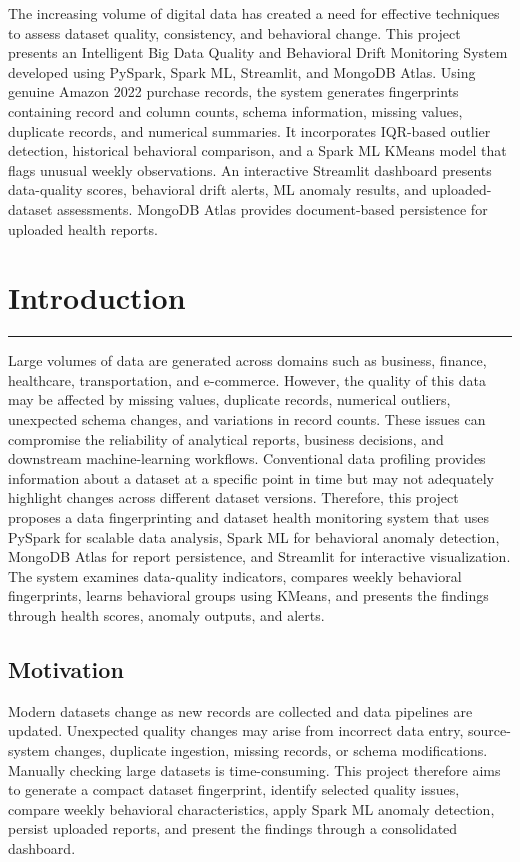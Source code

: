 \documentclass[12pt,a4paper]{report}
\begin{document}
The increasing volume of digital data has created a need for effective techniques to assess dataset quality, consistency, and behavioral change. This project presents an Intelligent Big Data Quality and Behavioral Drift Monitoring System developed using PySpark, Spark ML, Streamlit, and MongoDB Atlas. Using genuine Amazon 2022 purchase records, the system generates fingerprints containing record and column counts, schema information, missing values, duplicate records, and numerical summaries. It incorporates IQR-based outlier detection, historical behavioral comparison, and a Spark ML KMeans model that flags unusual weekly observations. An interactive Streamlit dashboard presents data-quality scores, behavioral drift alerts, ML anomaly results, and uploaded-dataset assessments. MongoDB Atlas provides document-based persistence for uploaded health reports.



\clearpage
\listoffigures
\clearpage
\tableofcontents
\clearpage
{}

\chapter{Introduction}
\rule{\textwidth}{2pt}

Large volumes of data are generated across domains such as business, finance, healthcare, transportation, and e-commerce. However, the quality of this data may be affected by missing values, duplicate records, numerical outliers, unexpected schema changes, and variations in record counts. These issues can compromise the reliability of analytical reports, business decisions, and downstream machine-learning workflows. Conventional data profiling provides information about a dataset at a specific point in time but may not adequately highlight changes across different dataset versions. Therefore, this project proposes a data fingerprinting and dataset health monitoring system that uses PySpark for scalable data analysis, Spark ML for behavioral anomaly detection, MongoDB Atlas for report persistence, and Streamlit for interactive visualization. The system examines data-quality indicators, compares weekly behavioral fingerprints, learns behavioral groups using KMeans, and presents the findings through health scores, anomaly outputs, and alerts.


\section{Motivation}
Modern datasets change as new records are collected and data pipelines are updated. Unexpected quality changes may arise from incorrect data entry, source-system changes, duplicate ingestion, missing records, or schema modifications. Manually checking large datasets is time-consuming. This project therefore aims to generate a compact dataset fingerprint, identify selected quality issues, compare weekly behavioral characteristics, apply Spark ML anomaly detection, persist uploaded reports, and present the findings through a consolidated dashboard.
\end{document}
